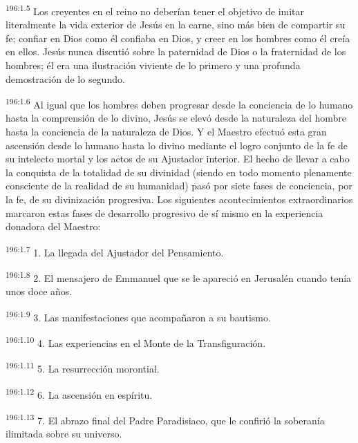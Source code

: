 \par 
\textsuperscript{196:1.5} Los creyentes en el reino no deberían tener el objetivo de imitar literalmente la vida exterior de Jesús en la carne, sino más bien de compartir su fe; confiar en Dios como él confiaba en Dios, y creer en los hombres como él creía en ellos. Jesús nunca discutió sobre la paternidad de Dios o la fraternidad de los hombres; él era una ilustración viviente de lo primero y una profunda demostración de lo segundo.

\par 
\textsuperscript{196:1.6} Al igual que los hombres deben progresar desde la conciencia de lo humano hasta la comprensión de lo divino, Jesús se elevó desde la naturaleza del hombre hasta la conciencia de la naturaleza de Dios. Y el Maestro efectuó esta gran ascensión desde lo humano hasta lo divino mediante el logro conjunto de la fe de su intelecto mortal y los actos de su Ajustador interior. El hecho de llevar a cabo la conquista de la totalidad de su divinidad (siendo en todo momento plenamente consciente de la realidad de su humanidad) pasó por siete fases de conciencia, por la fe, de su divinización progresiva. Los siguientes acontecimientos extraordinarios marcaron estas fases de desarrollo progresivo de sí mismo en la experiencia donadora del Maestro:

\par 
\textsuperscript{196:1.7} 1. La llegada del Ajustador del Pensamiento.

\par 
\textsuperscript{196:1.8} 2. El mensajero de Emmanuel que se le apareció en Jerusalén cuando tenía unos doce años.

\par 
\textsuperscript{196:1.9} 3. Las manifestaciones que acompañaron a su bautismo.

\par 
\textsuperscript{196:1.10} 4. Las experiencias en el Monte de la Transfiguración.

\par 
\textsuperscript{196:1.11} 5. La resurrección morontial.

\par 
\textsuperscript{196:1.12} 6. La ascensión en espíritu.

\par 
\textsuperscript{196:1.13} 7. El abrazo final del Padre Paradisiaco, que le confirió la soberanía ilimitada sobre su universo.

